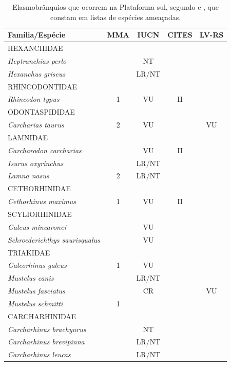 \documentclass[a4paper,11pt,twoside,showtrims,onecolumn,openright,final]{memoir}
\begin{document}
\begin{table}
\caption{Elasmobrânquios que ocorrem na Plataforma sul, segundo \citet{vooren1997} e \citet{soto2001a},
         que constam em listas de espécies ameaçadas.}
\label{tab:listas-ameacadas}	 
\begin{small}
\begin{tabular*}{\textwidth}{l@{\extracolsep{\fill}}cccc}
\toprule
Família/Espécie				& MMA	& IUCN	& CITES	& LV-RS \\
\midrule
\addlinespace
HEXANCHIDAE				& 	& 	& 	& 	\\
\emph{Heptranchias perlo}		& 	& NT	& 	& 	\\
\emph{Hexanchus griseus}		& 	& LR/NT	& 	& 	\\
\addlinespace
RHINCODONTIDAE				& 	& 	& 	& 	\\
\emph{Rhincodon typus}			& 1	& VU	& II	& 	\\
\addlinespace
ODONTASPIDIDAE				& 	& 	& 	& 	\\
\emph{Carcharias taurus}		& 2	& VU	& 	& VU	\\
\addlinespace
LAMNIDAE				& 	& 	& 	& 	\\
\emph{Carcharodon carcharias}		& 	& VU	& II	& 	\\
\emph{Isurus oxyrinchus}		& 	& LR/NT	& 	& 	\\
\emph{Lamna nasus}			& 2	& LR/NT	& 	& 	\\
\addlinespace
CETHORHINIDAE				& 	& 	& 	& 	\\
\emph{Cethorhinus maximus}		& 1	& VU	& II	& 	\\
\addlinespace
SCYLIORHINIDAE				& 	& 	& 	& 	\\
\emph{Galeus mincaronei}		& 	& VU	& 	& 	\\
\emph{Schroederichthys saurisqualus}	& 	& VU	& 	& 	\\
\addlinespace
TRIAKIDAE				& 	& 	& 	& 	\\
\emph{Galeorhinus galeus}		& 1	& VU	& 	& 	\\
\emph{Mustelus canis}			& 	& LR/NT	& 	& 	\\
\emph{Mustelus fasciatus}		& 	& CR	& 	& VU	\\
\emph{Mustelus schmitti}		& 1	& 	& 	& 	\\
\addlinespace
CARCHARHINIDAE				& 	& 	& 	& 	\\
\emph{Carcharhinus brachyurus}		& 	& NT	& 	& 	\\
\emph{Carcharhinus brevipinna}		& 	& LR/NT	& 	& 	\\
\emph{Carcharhinus leucas}		& 	& LR/NT	& 	& 	\\

\end{tabular*}
\end{small}
\end{table}
\end{document}
